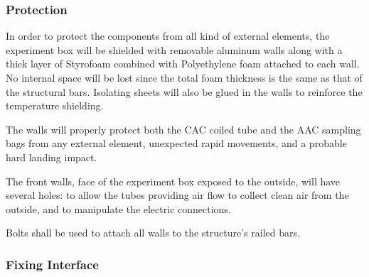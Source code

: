 

\subsubsection{Protection}

In order to protect the components from all kind of external elements, the experiment box will be shielded with removable aluminum walls along with a thick layer of Styrofoam combined with Polyethylene foam attached to each wall. No internal space will be lost since the total foam thickness is the same as that of the structural bars. Isolating sheets will also be glued in the walls to reinforce the temperature shielding.

The walls will properly protect both the CAC coiled tube and the AAC sampling bags from any external element, unexpected rapid movements, and a probable hard landing impact.




The front walls, face of the experiment box exposed to the outside, will have several holes: to allow the tubes providing air flow to collect clean air from the outside, and to manipulate the electric connections.


Bolts shall be used to attach all walls to the structure's railed bars.




\subsubsection{Fixing Interface}

